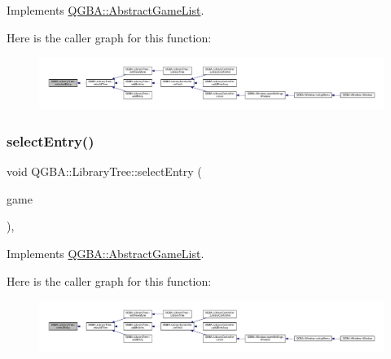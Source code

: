 Implements \mbox{\hyperlink{class_q_g_b_a_1_1_abstract_game_list_ac456bb5443e0b60ff7fb6e3d64fbb338}{Q\+G\+B\+A\+::\+Abstract\+Game\+List}}.

Here is the caller graph for this function\+:
\nopagebreak
\begin{figure}[H]
\begin{center}
\leavevmode
\includegraphics[width=350pt]{class_q_g_b_a_1_1_library_tree_a4066e38c1708df9e31f451c78c3905bc_icgraph}
\end{center}
\end{figure}
\mbox{\label{class_q_g_b_a_1_1_library_tree_a6d3e6a1d0b807bd7765e2b02e7a86d68}} 
\subsubsection{\texorpdfstring{select\+Entry()}{selectEntry()}}
{\footnotesize\ttfamily void Q\+G\+B\+A\+::\+Library\+Tree\+::select\+Entry (\begin{DoxyParamCaption}\item[{\mbox{\hyperlink{namespace_q_g_b_a_a201fa9f2cb8f778666a134ba81909358}{Library\+Entry\+Ref}}}]{game }\end{DoxyParamCaption})\hspace{0.3cm}{\ttfamily [override]}, {\ttfamily [virtual]}}



Implements \mbox{\hyperlink{class_q_g_b_a_1_1_abstract_game_list_af39316d3b224014e8a2763561e1cdcdd}{Q\+G\+B\+A\+::\+Abstract\+Game\+List}}.

Here is the caller graph for this function\+:
\nopagebreak
\begin{figure}[H]
\begin{center}
\leavevmode
\includegraphics[width=350pt]{class_q_g_b_a_1_1_library_tree_a6d3e6a1d0b807bd7765e2b02e7a86d68_icgraph}
\end{center}
\end{figure}
\mbox{\label{class_q_g_b_a_1_1_library_tree_a2782544a4651fbf6529cd495ec980d9a}} 
